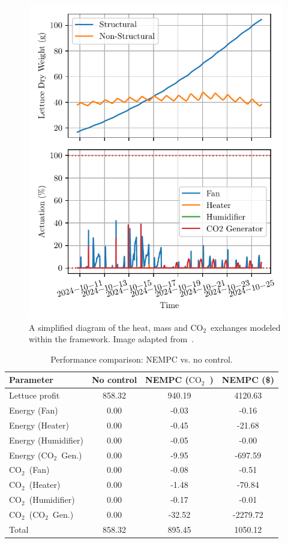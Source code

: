 \documentclass[conference]{IEEEtran}
\newcommand{\coo}{\ensuremath{\mathrm{CO_2}}}
\begin{document}
\begin{figure}\label{fig:control}
    \centering
    \includegraphics[width=.5\textwidth]{figures/greenhouse_control-mpc-N_5-steps_10801.pdf}
    \caption{A simplified diagram of the heat, mass and \coo\ exchanges modeled within the framework. Image adapted from~\cite{rmward61_2019}.}
\end{figure}

\begin{table}
    \centering
    \caption{Performance comparison: NEMPC {vs. } no control.}\label{tab:comparison}
    \begin{tabular}{lS[table-format=4.2]S[table-format=4.2]S[table-format=4.2]}
        \toprule
        Parameter           & {No control} & {NEMPC (\coo\ )} & {NEMPC (\$)} \\
        \midrule
        Lettuce profit      & 858.32       & 940.19           & 4120.63      \\
        Energy (Fan)        & 0.00         & -0.03            & -0.16        \\
        Energy (Heater)     & 0.00         & -0.45            & -21.68       \\
        Energy (Humidifier) & 0.00         & -0.05            & -0.00        \\
        Energy (\coo\ Gen.) & 0.00         & -9.95            & -697.59      \\
        \coo\ (Fan)         & 0.00         & -0.08            & -0.51        \\
        \coo\ (Heater)      & 0.00         & -1.48            & -70.84       \\
        \coo\ (Humidifier)  & 0.00         & -0.17            & -0.01        \\
        \coo\ (\coo\ Gen.)  & 0.00         & -32.52           & -2279.72     \\
        \midrule
        Total               & 858.32       & 895.45           & 1050.12      \\
        \bottomrule
    \end{tabular}
\end{table}
\end{document}
